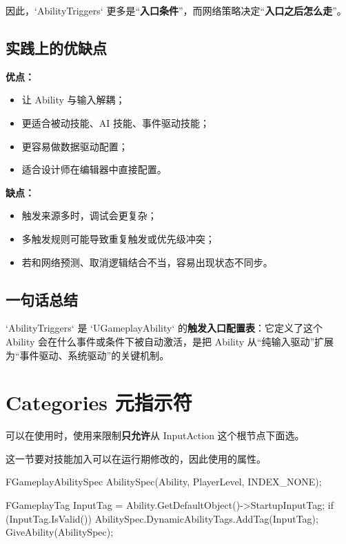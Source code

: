 \documentclass[10pt,CJKmath]{ctexart}
\begin{document}
因此，`AbilityTriggers` 更多是“\textbf{入口条件}”，而网络策略决定“\textbf{入口之后怎么走}”。

\subsection{实践上的优缺点}

\textbf{优点：}
\begin{itemize}
	\item 让 Ability 与输入解耦；
	\item 更适合被动技能、AI 技能、事件驱动技能；
	\item 更容易做数据驱动配置；
	\item 适合设计师在编辑器中直接配置。
\end{itemize}

\textbf{缺点：}
\begin{itemize}
	\item 触发来源多时，调试会更复杂；
	\item 多触发规则可能导致重复触发或优先级冲突；
	\item 若和网络预测、取消逻辑结合不当，容易出现状态不同步。
\end{itemize}

\subsection{一句话总结}

`AbilityTriggers` 是 `UGameplayAbility` 的\textbf{触发入口配置表}：它定义了这个 Ability 会在什么事件或条件下被自动激活，是把 Ability 从“纯输入驱动”扩展为“事件驱动、系统驱动”的关键机制。

\section{Categories 元指示符}
可以在使用时，使用来限制\textbf{只允许}从 InputAction 这个根节点下面选。

这一节要对技能加入可以在运行期修改的，因此使用的属性。
\begin{code}
FGameplayAbilitySpec AbilitySpec(Ability, PlayerLevel, INDEX_NONE);

FGameplayTag InputTag = Ability.GetDefaultObject()->StartupInputTag;
if (InputTag.IsValid())
{
	AbilitySpec.DynamicAbilityTags.AddTag(InputTag);
}
GiveAbility(AbilitySpec);
\end{code}
\end{document}
